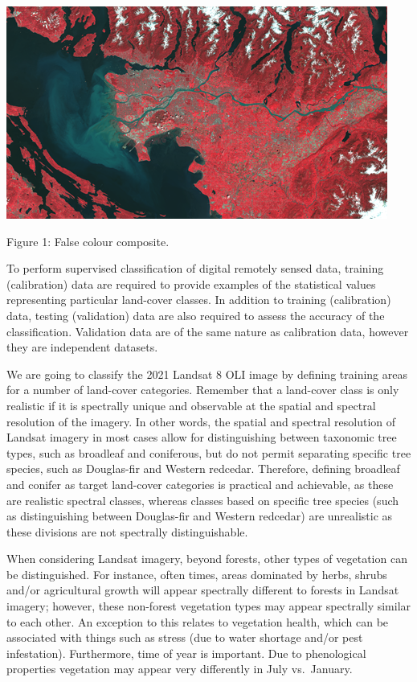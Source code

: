 \documentclass[
]{book}
\begin{document}
\begin{center}\includegraphics[width=0.8\linewidth]{images/08-false-colour-composite} \end{center}

Figure 1: False colour composite.

To perform supervised classification of digital remotely sensed data, training (calibration) data are required to provide examples of the statistical values representing particular land-cover classes. In addition to training (calibration) data, testing (validation) data are also required to assess the accuracy of the classification. Validation data are of the same nature as calibration data, however they are independent datasets.

We are going to classify the 2021 Landsat 8 OLI image by defining training areas for a number of land-cover categories. Remember that a land-cover class is only realistic if it is spectrally unique and observable at the spatial and spectral resolution of the imagery. In other words, the spatial and spectral resolution of Landsat imagery in most cases allow for distinguishing between taxonomic tree types, such as broadleaf and coniferous, but do not permit separating
specific tree species, such as Douglas-fir and Western redcedar. Therefore, defining broadleaf and conifer as target land-cover categories is practical and achievable, as these are realistic spectral classes, whereas classes based on specific tree species (such as distinguishing between Douglas-fir and Western redcedar) are unrealistic as these divisions are not spectrally distinguishable.

When considering Landsat imagery, beyond forests, other types of vegetation can be distinguished. For instance, often times, areas dominated by herbs, shrubs and/or agricultural growth will appear spectrally different to forests in Landsat imagery; however, these non-forest vegetation types may appear spectrally similar to each other. An exception to this relates to vegetation health, which can be associated with things such as stress (due to water shortage and/or pest infestation). Furthermore, time of year is important. Due to phenological properties vegetation may appear very differently in July vs.~January.
\end{document}
